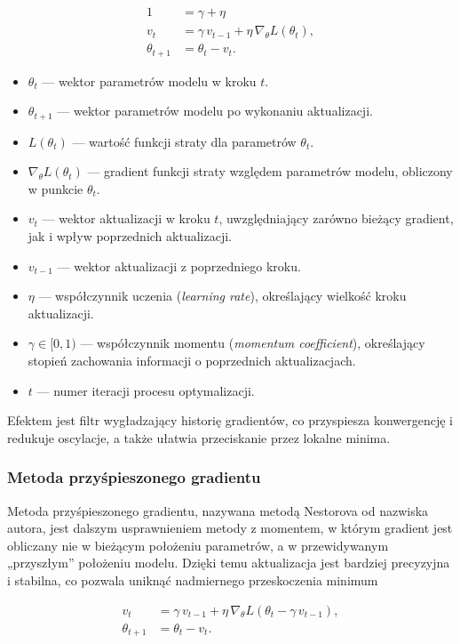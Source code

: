 \[
\begin{aligned}
	1 &= \gamma + \eta \\
	v_t        &= \gamma\, v_{t-1} + \eta\, \nabla_{\theta} L(\theta_t),\\
	\theta_{t+1} &= \theta_t - v_t.
\end{aligned}
\]

\begin{itemize}
	\item $\theta_t$ — wektor parametrów modelu w kroku $t$.
	\item $\theta_{t+1}$ — wektor parametrów modelu po wykonaniu aktualizacji.
	\item $L(\theta_t)$ — wartość funkcji straty dla parametrów $\theta_t$.
	\item $\nabla_{\theta} L(\theta_t)$ — gradient funkcji straty względem parametrów modelu, obliczony w punkcie $\theta_t$.
	\item $v_t$ — wektor aktualizacji w kroku $t$, uwzględniający zarówno bieżący gradient, jak i wpływ poprzednich aktualizacji.
	\item $v_{t-1}$ — wektor aktualizacji z poprzedniego kroku.
	\item $\eta$ — współczynnik uczenia (\textit{learning rate}), określający wielkość kroku aktualizacji.
	\item $\gamma \in [0,1)$ — współczynnik momentu (\textit{momentum coefficient}), określający stopień zachowania informacji o poprzednich aktualizacjach.
	\item $t$ — numer iteracji procesu optymalizacji.
\end{itemize}

Efektem jest filtr wygładzający historię gradientów, co przyspiesza konwergencję i redukuje oscylacje, a także ułatwia przeciskanie przez lokalne minima.

\subsubsection*{Metoda przyśpieszonego gradientu}

Metoda przyśpieszonego gradientu, nazywana metodą Nestorova od nazwiska autora, jest dalszym usprawnieniem metody z momentem, w którym gradient jest obliczany nie w bieżącym położeniu parametrów, a w przewidywanym „przyszłym” położeniu modelu. Dzięki temu aktualizacja jest bardziej precyzyjna i stabilna, co pozwala uniknąć nadmiernego przeskoczenia minimum \cite{Nesterov1983}

\[
\begin{aligned}
	v_t &= \gamma\, v_{t-1} + \eta\, \nabla_{\theta} L(\theta_t - \gamma\, v_{t-1}),\\
	\theta_{t+1} &= \theta_t - v_t.
\end{aligned}
\]

